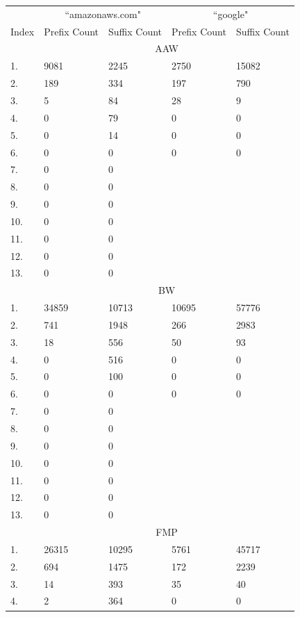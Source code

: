 \documentclass{article}
\begin{document}
\begin{longtable}{l|l|l||l|l}
    & \multicolumn{2}{c|}{``amazonaws.com"} & \multicolumn{2}{c}{``google"} \\
    Index & Prefix Count & Suffix Count & Prefix Count & Suffix Count \\
    \hline
    & \multicolumn{4}{c}{AAW} \\
    \hline
    1. & 9081 & 2245 & 2750 & 15082 \\
    2. & 189 & 334 & 197 & 790 \\
    3. & 5 & 84 & 28 & 9 \\
    4. & 0 & 79 & 0 & 0 \\
    5. & 0 & 14 & 0 & 0 \\
    6. & 0 & 0 & 0 & 0 \\
    7. & 0 & 0 & & \\
    8. & 0 & 0 & & \\
    9. & 0 & 0 & & \\
    10. & 0 & 0 & & \\
    11. & 0 & 0 & & \\
    12. & 0 & 0 & & \\
    13. & 0 & 0 & & \\
    \hline
    & \multicolumn{4}{c}{BW} \\
    \hline
    1. & 34859 & 10713 & 10695 & 57776\\
    2. & 741 & 1948 & 266 & 2983\\
    3. & 18 & 556 & 50 & 93\\
    4. & 0 & 516 & 0 & 0\\
    5. & 0 & 100 & 0 & 0\\
    6. & 0 & 0 & 0 & 0\\
    7. & 0 & 0 & & \\
    8. & 0 & 0 & & \\
    9. & 0 & 0 & & \\
    10. & 0 & 0 & & \\
    11. & 0 & 0 & & \\
    12. & 0 & 0 & & \\
    13. & 0 & 0 & & \\
    \hline
    & \multicolumn{4}{c}{FMP} \\
    \hline
    1. & 26315 & 10295 & 5761 & 45717\\
    2. & 694 & 1475 & 172 & 2239\\
    3. & 14 & 393 & 35 & 40\\
    4. & 2 & 364 & 0 & 0\\

\end{longtable}
\end{document}
